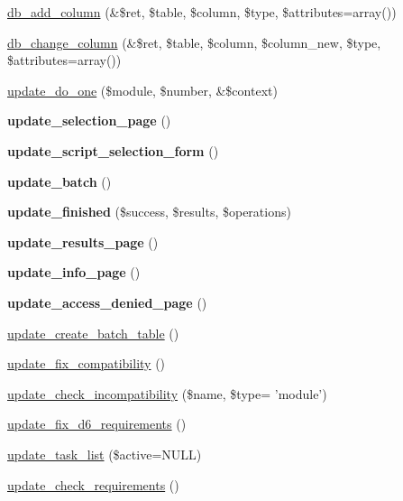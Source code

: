 \begin{CompactItemize}
\item 
\hyperlink{update_8php_68749bcc3e7949ede51c5dd2db91f39e}{db\_\-add\_\-column} (\&\$ret, \$table, \$column, \$type, \$attributes=array())
\item 
\hyperlink{update_8php_f6bd7fe55aa398bb18266c56be8bf97b}{db\_\-change\_\-column} (\&\$ret, \$table, \$column, \$column\_\-new, \$type, \$attributes=array())
\item 
\hyperlink{update_8php_2ee6f43ad07357556589cfcee024e203}{update\_\-do\_\-one} (\$module, \$number, \&\$context)
\item 
\hypertarget{update_8php_48489df1aa5e2189ef6e7fae71de8203}{
\textbf{update\_\-selection\_\-page} ()}
\label{update_8php_48489df1aa5e2189ef6e7fae71de8203}

\item 
\hypertarget{update_8php_6190d3cb165751d2620de354a95bccda}{
\textbf{update\_\-script\_\-selection\_\-form} ()}
\label{update_8php_6190d3cb165751d2620de354a95bccda}

\item 
\hypertarget{update_8php_0609048e545eeffbc24aafae61dbbe40}{
\textbf{update\_\-batch} ()}
\label{update_8php_0609048e545eeffbc24aafae61dbbe40}

\item 
\hypertarget{update_8php_80f7fdd8ca66ebda4959b9429fc343f3}{
\textbf{update\_\-finished} (\$success, \$results, \$operations)}
\label{update_8php_80f7fdd8ca66ebda4959b9429fc343f3}

\item 
\hypertarget{update_8php_b8c386cf40f35717b820735b5a8f7745}{
\textbf{update\_\-results\_\-page} ()}
\label{update_8php_b8c386cf40f35717b820735b5a8f7745}

\item 
\hypertarget{update_8php_1c9b293ee11117ef8911b52809e75bde}{
\textbf{update\_\-info\_\-page} ()}
\label{update_8php_1c9b293ee11117ef8911b52809e75bde}

\item 
\hypertarget{update_8php_a43f1c9a3442570821ad190a3dd429db}{
\textbf{update\_\-access\_\-denied\_\-page} ()}
\label{update_8php_a43f1c9a3442570821ad190a3dd429db}

\item 
\hyperlink{update_8php_123fb38f4b7623d8ee5948c0d2e748eb}{update\_\-create\_\-batch\_\-table} ()
\item 
\hyperlink{update_8php_b86cb0f00b89fc52f7f6294be9a1e33c}{update\_\-fix\_\-compatibility} ()
\item 
\hyperlink{update_8php_39592132a77fd791c44a8d6faf362cb0}{update\_\-check\_\-incompatibility} (\$name, \$type= 'module')
\item 
\hyperlink{update_8php_f9abb57ca11fefe877843be4211307c4}{update\_\-fix\_\-d6\_\-requirements} ()
\item 
\hyperlink{update_8php_3563d865f4b5eb7e86e9254410438679}{update\_\-task\_\-list} (\$active=NULL)
\item 
\hyperlink{update_8php_d0b8cf7510033800502402c275add53b}{update\_\-check\_\-requirements} ()
\end{CompactItemize}
